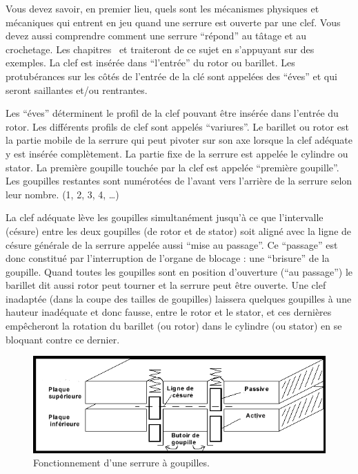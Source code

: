 \documentclass[a4paper,french,11pt,twoside]{report}
\begin{document}
Vous devez savoir, en premier lieu, quels sont les mécanismes physiques et mécaniques qui entrent en jeu quand une serrure est ouverte par une clef. Vous devez aussi comprendre comment une serrure \enquote{répond} au tâtage et au crochetage. Les chapitres~ et  traiteront de ce sujet en s'appuyant sur des exemples.
La clef est insérée dans \enquote{l'entrée} du rotor ou barillet. Les protubérances sur les côtés de l'entrée de la clé sont appelées des \enquote{éves} et qui seront saillantes et/ou rentrantes.

Les \enquote{éves} déterminent le profil de la clef pouvant être insérée dans l'entrée du rotor. Les différents profils de clef sont appelés \enquote{variures}. Le barillet ou rotor est la partie mobile de la serrure qui peut pivoter sur son axe lorsque la clef adéquate y est insérée complètement. La partie fixe de la serrure est appelée le cylindre ou stator. La première goupille touchée par la clef est appelée \enquote{première goupille}. Les goupilles restantes sont numérotées de l'avant vers l'arrière de la serrure selon leur nombre. (1, 2, 3, 4, \ldots)

La clef adéquate lève les goupilles simultanément jusqu'à ce que l'intervalle (césure) entre les deux goupilles (de rotor et de stator) soit aligné avec la ligne de césure générale de la serrure appelée aussi \enquote{mise au  passage}. Ce \enquote{passage} est donc constitué par l'interruption de l'organe de blocage : une \enquote{brisure} de la goupille.  Quand toutes les goupilles sont en position d'ouverture (\enquote{au passage}) le barillet dit aussi rotor peut tourner et la serrure peut être ouverte. Une clef inadaptée (dans la coupe des tailles de goupilles) laissera quelques goupilles à une hauteur inadéquate et donc fausse, entre le rotor et le stator, et ces dernières empêcheront la rotation du barillet (ou rotor) dans le cylindre (ou stator) en se bloquant contre ce dernier.


\begin{figure}[h]
  \includegraphics[width=16cm]{images/image2_goupille}
  \caption{Fonctionnement d'une serrure à goupilles.\label{fonctionnement_serrure_goupilles}}
\end{figure}
\end{document}
